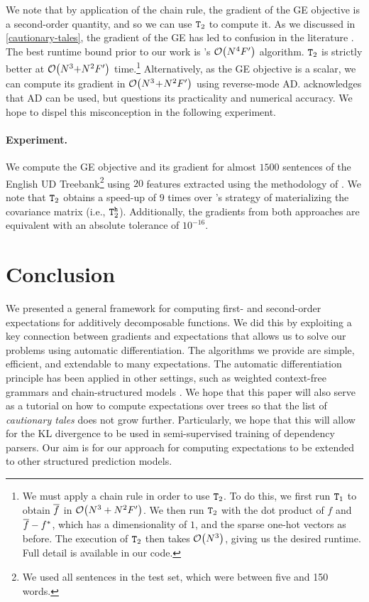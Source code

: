 \documentclass[11pt,a4paper]{article}
\theoremstyle{definition}
\begin{document}
We note that by application of the chain rule, the gradient of the GE objective is a second-order quantity, and so we can use $\texttt{T}_2$
to compute it.
As we discussed in \cref{cautionary-tales}, the gradient of the GE has led to confusion in the literature \citep{druck-etal-2009-semi, druck09covariance, druck-thesis}.
The best runtime bound prior to our work is \citet{druck-etal-2009-semi}'s $\mathcal{O}\!\left({N}^4 {F'}\right)$ algorithm.  $\texttt{T}_2$ is strictly better at $\mathcal{O}\!\left({N}^3 {+} {N}^2 {F'}\right)$ time.\footnote{We must apply a chain rule in order to use $\texttt{T}_2$. To do this, we first run $\texttt{T}_1$ to obtain ${\overline{f}}$ in $\mathcal{O}\!\left({N}^3+{N}^2{F'}\right)$. We then run $\texttt{T}_2$ with the dot product of $f$ and ${\overline{f}}-{f^*}$, which has a dimensionality of $1$, and the sparse one-hot vectors as before. The execution of $\texttt{T}_2$ then takes $\mathcal{O}\!\left({N}^3\right)$, giving us the desired runtime. Full detail is available in our code.}
Alternatively, as the GE objective is a scalar, we can compute its gradient in $\mathcal{O}\!\left({N}^3\!+\!{N}^2 {F'}\right)$ using reverse-mode AD.
\citet{druck-thesis} acknowledges that AD can be used, but questions its practicality and numerical accuracy.  We hope to dispel this misconception in the following experiment.


\paragraph{Experiment.} We compute the GE objective and its gradient for almost $1500$ sentences of the English UD Treebank\footnote{We used all sentences in the test set, which were between five and 150 words.} \citep{ud} using $20$ features extracted using the methodology of \citet{druck-etal-2009-semi}.
We note that $\texttt{T}_2$ obtains a speed-up of $9$ times over \citet{druck09covariance}'s strategy of materializing the covariance matrix (i.e., $\texttt{T}_2^{\texttt{h}}$).
Additionally, the gradients from both approaches are equivalent with an absolute tolerance of $10^{-16}$.

\section{Conclusion}\label{sec:conc}
We presented a general framework for computing first- and second-order expectations for additively decomposable functions.
We did this by exploiting a key connection between gradients and expectations that allows us to solve our problems using automatic differentiation.
The algorithms we provide are simple, efficient, and extendable to many expectations.
The automatic differentiation principle has been applied in other settings, such as weighted context-free grammars \citep{eisner16backprop} and chain-structured models \citep{vieira-etal-2016-speed}.
We hope that this paper will also serve as a tutorial on how to compute expectations over trees so that the list of \emph{cautionary tales} does not grow further.
Particularly, we hope that this will allow for the KL divergence to be used in semi-supervised training of dependency parsers.
Our aim is for our approach for computing expectations to be extended to other structured prediction models.
\end{document}
